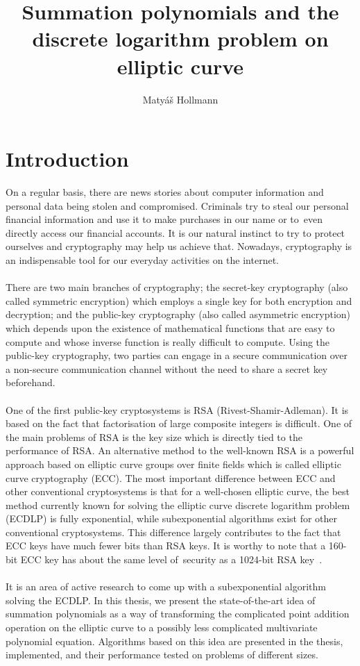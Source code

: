 \documentclass[thesis=M,english]{FITthesis}[2012/10/20]
\title{Summation polynomials and the discrete logarithm problem on elliptic curve}
\author{Matyáš Hollmann} %
\theoremstyle{remark}
\theoremstyle{definition}
\begin{document}

\chapter{Introduction}
On a regular basis, there are news stories about computer information and personal data being stolen and compromised. Criminals try to steal our personal financial information and use it to make purchases in our name or to~even directly access our financial accounts. It is our natural instinct to try to protect ourselves and cryptography may help us achieve that. Nowadays, cryptography is an indispensable tool for our everyday activities on the internet. \\ \\
\noindent There are two main branches of cryptography; the secret-key cryptography (also called symmetric encryption) which employs a single key for both encryption and decryption; and the public-key cryptography (also called asymmetric encryption) which depends upon the existence of mathematical functions that are easy to compute and whose inverse function is really difficult to compute. Using the public-key cryptography, two parties can engage in a secure communication over a non-secure communication channel without the need to share a secret key beforehand. \\ \\
\noindent One of the first public-key cryptosystems is RSA (Rivest-Shamir-Adleman). It is based on the fact that factorisation of large composite integers is difficult. One of the main problems of RSA is the key size which is directly tied to the performance of RSA. An alternative method to the well-known RSA is a powerful approach based on elliptic curve groups over finite fields which is called elliptic curve cryptography (ECC). The most important difference between ECC and other conventional cryptosystems is that for a well-chosen elliptic curve, the best method currently known for solving the elliptic curve discrete logarithm problem (ECDLP) is fully exponential, while subexponential algorithms exist for other conventional cryptosystems. This difference largely contributes to the fact that ECC keys have much fewer bits than RSA keys. It is worthy to note that a 160-bit ECC key has about the same level of~security as a 1024-bit RSA key~\cite{secTest}.
\\
\\
\noindent 
It is an area of active research to come up with a subexponential algorithm solving the ECDLP. In this thesis, we present the state-of-the-art idea of summation polynomials as a way of transforming the complicated point addition operation on the elliptic curve to a possibly less complicated multivariate polynomial equation. Algorithms based on this idea are presented in the thesis, implemented, and their performance tested on problems of different sizes.  
\end{document}
